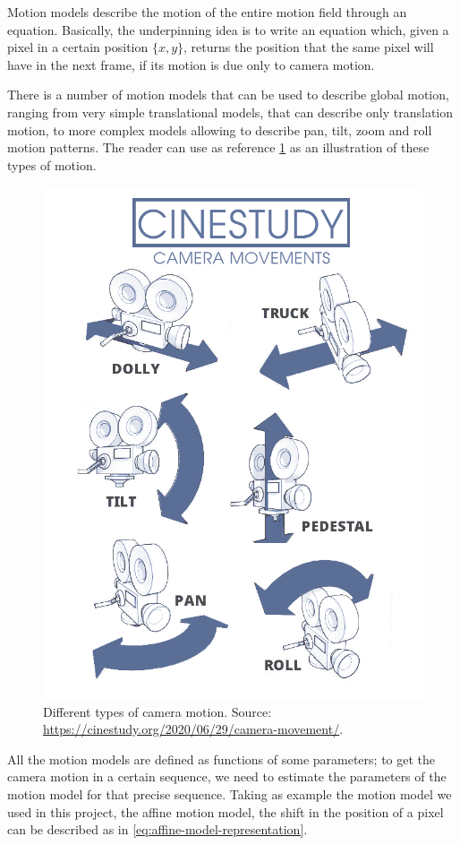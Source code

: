 Motion models describe the motion of the entire motion field through an equation. Basically, the underpinning idea is to write an equation which, given a pixel in a certain position $\{x,y\}$, returns the position that the same pixel will have in the next frame, if its motion is due only to camera motion.

There is a number of motion models that can be used to describe global motion, ranging from very simple translational models, that can describe only translation motion, to more complex models allowing to describe pan, tilt, zoom and roll motion patterns. The reader can use as reference \cref{fig:camera-motion} as an illustration of these types of motion.

\begin{figure}
    \centering
    \includegraphics[width=.7\linewidth]{../assets/images/camera-movement.png}
    \caption{Different types of camera motion. Source: \url{https://cinestudy.org/2020/06/29/camera-movement/}.}
    \label{fig:camera-motion}
\end{figure}

All the motion models are defined as functions of some parameters; to get the camera motion in a certain sequence, we need to estimate the parameters of the motion model for that precise sequence. Taking as example the motion model we used in this project, the affine motion model, the shift in the position of a pixel can be described as in \cref{eq:affine-model-representation}.

